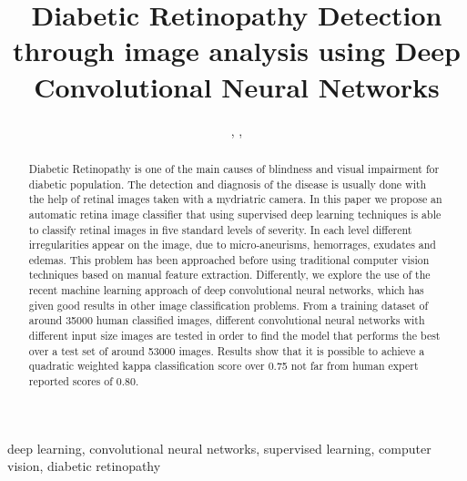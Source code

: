 \documentclass{IOS-Book-Article}
\begin{document}
\pagestyle{headings}
\def\thepage{}
\begin{frontmatter}                            %

\title{Diabetic Retinopathy Detection through image analysis using Deep Convolutional Neural Networks
}

\author{ ,  ,  }

\address{Departament d'Enginyeria Inform\`{a}tica i Matem\`{a}tiques\\ Universitat Rovira i Virgili, Tarragona}



\begin{abstract}
Diabetic Retinopathy is one of the main causes of blindness and visual impairment for diabetic population. The detection and diagnosis of the disease is usually done with the help of retinal images taken with a mydriatric camera. In this paper we propose an automatic retina image classifier that using supervised deep learning techniques is able to classify retinal images in five standard levels of severity. In each level different irregularities appear on the image, due to micro-aneurisms, hemorrages, exudates and edemas. This problem has been approached before using traditional computer vision techniques based on manual feature extraction. Differently, we explore the use of the recent machine learning approach of deep convolutional neural networks, which has given good results in other image classification problems. From a training dataset of around 35000 human classified images, different convolutional neural networks with different input size images are tested in order to find the model that performs the best over a test set of around 53000 images. Results show that it is possible to achieve a quadratic weighted kappa classification score over 0.75 not far from human expert reported scores of 0.80.

\end{abstract}

\begin{keyword}
deep learning, convolutional neural networks, supervised learning, computer vision, diabetic retinopathy
\end{keyword}
\end{frontmatter}
\end{document}
